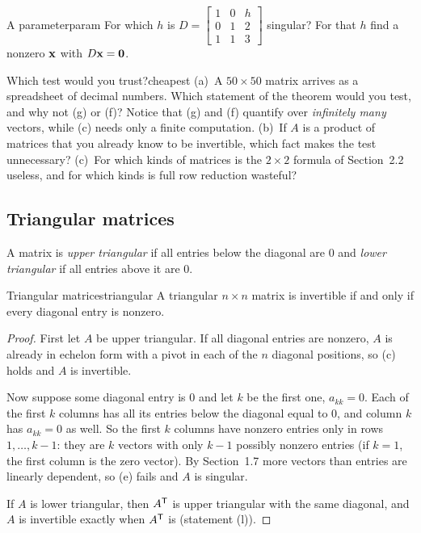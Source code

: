 \documentclass[11pt]{article}
\begin{document}
\begin{kc}{A parameter}{param}
For which $h$ is $D=\begin{bmatrix}1&0&h\\0&1&2\\1&1&3\end{bmatrix}$ singular? For that $h$ find a nonzero $\mathbf{x}$ with $D\mathbf{x}=\mathbf{0}$.
\end{kc}

\begin{think}{Which test would you trust?}{cheapest}
(a)~A $50\times50$ matrix arrives as a spreadsheet of decimal numbers. Which statement of the theorem would you test, and why not (g) or (f)? Notice that (g) and (f) quantify over \emph{infinitely many} vectors, while (c) needs only a finite computation. (b)~If $A$ is a product of matrices that you already know to be invertible, which fact makes the test unnecessary? (c)~For which kinds of matrices is the $2\times2$ formula of Section~2.2 useless, and for which kinds is full row reduction wasteful?
\end{think}

\subsection*{Triangular matrices}

A matrix is \emph{upper triangular} if all entries below the diagonal are $0$ and \emph{lower triangular} if all entries above it are $0$.

\begin{thm}{Triangular matrices}{triangular}
A triangular $n\times n$ matrix is invertible if and only if every diagonal entry is nonzero.
\end{thm}

\begin{proof}
First let $A$ be upper triangular. If all diagonal entries are nonzero, $A$ is already in echelon form with a pivot in each of the $n$ diagonal positions, so (c) holds and $A$ is invertible.

Now suppose some diagonal entry is $0$ and let $k$ be the first one, $a_{kk}=0$. Each of the first $k$ columns has all its entries below the diagonal equal to $0$, and column $k$ has $a_{kk}=0$ as well. So the first $k$ columns have nonzero entries only in rows $1,\dots,k-1$: they are $k$ vectors with only $k-1$ possibly nonzero entries (if $k=1$, the first column is the zero vector). By Section~1.7 more vectors than entries are linearly dependent, so (e) fails and $A$ is singular.

If $A$ is lower triangular, then $A^{\mathsf T}$ is upper triangular with the same diagonal, and $A$ is invertible exactly when $A^{\mathsf T}$ is (statement (l)).
\end{proof}
\end{document}
